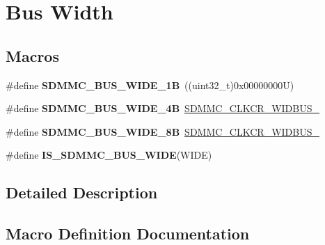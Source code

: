 \hypertarget{group___s_d_m_m_c___l_l___bus___wide}{}\section{Bus Width}
\label{group___s_d_m_m_c___l_l___bus___wide}
\subsection*{Macros}
\begin{DoxyCompactItemize}
\item 
\mbox{\label{group___s_d_m_m_c___l_l___bus___wide_ga099e65b93fbf34caa9acf916e4c29cd5}} 
\#define {\bfseries S\+D\+M\+M\+C\+\_\+\+B\+U\+S\+\_\+\+W\+I\+D\+E\+\_\+1B}~((uint32\+\_\+t)0x00000000\+U)
\item 
\mbox{\label{group___s_d_m_m_c___l_l___bus___wide_gaa25a9139a839bab9f1fddaf02cde16be}} 
\#define {\bfseries S\+D\+M\+M\+C\+\_\+\+B\+U\+S\+\_\+\+W\+I\+D\+E\+\_\+4B}~\mbox{\hyperlink{group___peripheral___registers___bits___definition_gab4201a1808b7e3218a3fa13dc4d6b0f9}{S\+D\+M\+M\+C\+\_\+\+C\+L\+K\+C\+R\+\_\+\+W\+I\+D\+B\+U\+S\+\_}}
\item 
\mbox{\label{group___s_d_m_m_c___l_l___bus___wide_ga944051980d77df9ab5f810c63904cb2a}} 
\#define {\bfseries S\+D\+M\+M\+C\+\_\+\+B\+U\+S\+\_\+\+W\+I\+D\+E\+\_\+8B}~\mbox{\hyperlink{group___peripheral___registers___bits___definition_gab699ad42b7dddd3af4dd41e1ef7a410b}{S\+D\+M\+M\+C\+\_\+\+C\+L\+K\+C\+R\+\_\+\+W\+I\+D\+B\+U\+S\+\_}}
\item 
\#define {\bfseries I\+S\+\_\+\+S\+D\+M\+M\+C\+\_\+\+B\+U\+S\+\_\+\+W\+I\+DE}(W\+I\+DE)
\end{DoxyCompactItemize}


\subsection{Detailed Description}


\subsection{Macro Definition Documentation}
\mbox{\label{group___s_d_m_m_c___l_l___bus___wide_ga7e196163aa0115e6932c1b5a0b8fb672}} 
